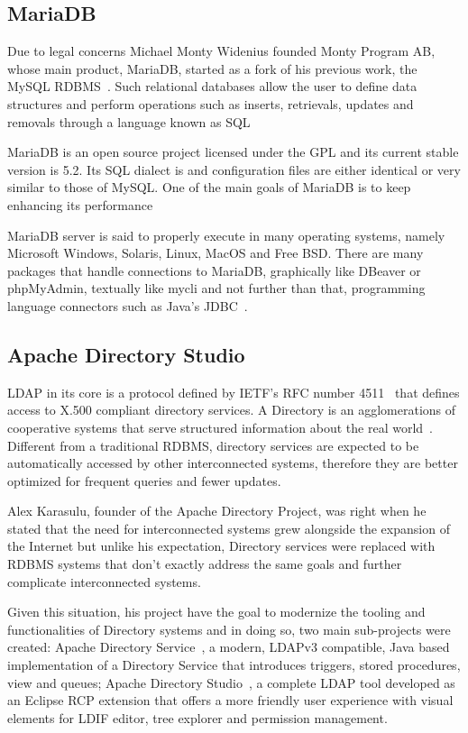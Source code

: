 \subsection{MariaDB}
Due to legal concerns Michael Monty Widenius founded Monty Program AB, whose main product, MariaDB, started as a fork of his previous work, the MySQL \gls{RDBMS}~\cite{MAVRO:2014}. Such relational databases allow the user to define data structures and perform operations such as inserts, retrievals, updates and removals through a language known as \gls{SQL}

MariaDB is an open source project licensed under the \gls{GPL} and its current stable version is 5.2. Its \gls{SQL} dialect is and configuration files are either identical or very similar to those of MySQL. One of the main goals of MariaDB is to keep enhancing its performance~\cite{BARTHOLOMEW:2012}

MariaDB server is said to properly execute in many operating systems, namely Microsoft Windows, Solaris, Linux, MacOS and Free BSD. There are many packages that handle connections to MariaDB, graphically like DBeaver or phpMyAdmin, textually like mycli and not further than that, programming language connectors such as Java's \gls{JDBC}~\cite{MARIADB:2019}.

\subsection{Apache Directory Studio}\label{ads}
\gls{LDAP} in its core is a protocol defined by \gls{IETF}'s \gls{RFC} number 4511~\cite{ldaprfc} that defines access to X.500 compliant directory services. A Directory is an agglomerations of cooperative systems that serve structured information about the real world~\cite{x500}. Different from a traditional \gls{RDBMS}, directory services are expected to be automatically accessed by other interconnected systems, therefore they are better optimized for frequent queries and fewer updates.

Alex Karasulu, founder of the Apache Directory Project, was right when he stated that the need for interconnected systems grew alongside the expansion of the Internet but unlike his expectation, Directory services were replaced with \gls{RDBMS} systems that don't exactly address the same goals and further complicate interconnected systems\cite{apachedp}.

Given this situation, his project have the goal to modernize the tooling and functionalities of Directory systems and in doing so, two main sub-projects were created: Apache Directory Service~\cite{apachedservice}, a modern, \gls{LDAP}v3 compatible, Java based implementation of a Directory Service that introduces triggers, stored procedures, view and queues; Apache Directory Studio~\cite{apacheds}, a complete \gls{LDAP} tool developed as an Eclipse \gls{RCP} extension that offers a more friendly user experience with visual elements for  \gls{LDIF} editor, tree explorer and permission management.

